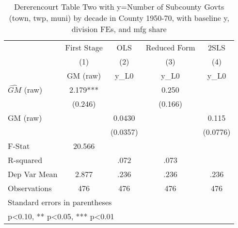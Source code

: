\begin{table}[htbp]\centering
\def\sym#1{\ifmmode^{#1}\else\(^{#1}\)\fi}
\caption{Dererencourt Table Two with y=Number of Subcounty Govts (town, twp, muni) by decade in County 1950-70, with baseline y, division FEs, and mfg share}
\begin{tabular}{l*{4}{c}}
\toprule
                    & First Stage   &         OLS   &Reduced Form   &        2SLS   \\
                    &\multicolumn{1}{c}{(1)}&\multicolumn{1}{c}{(2)}&\multicolumn{1}{c}{(3)}&\multicolumn{1}{c}{(4)}\\
                    &\multicolumn{1}{c}{GM  (raw)}&\multicolumn{1}{c}{y\_L0}&\multicolumn{1}{c}{y\_L0}&\multicolumn{1}{c}{y\_L0}\\
\midrule
$\hat{GM}$ (raw)    &       2.179***&               &       0.250   &               \\
                    &     (0.246)   &               &     (0.166)   &               \\
\addlinespace
GM  (raw)           &               &      0.0430   &               &       0.115   \\
                    &               &    (0.0357)   &               &    (0.0776)   \\
\midrule
F-Stat              &      20.566   &               &               &               \\
R-squared           &               &        .072   &        .073   &               \\
Dep Var Mean        &       2.877   &        .236   &        .236   &        .236   \\
Observations        &         476   &         476   &         476   &         476   \\
\bottomrule
\multicolumn{5}{l}{\footnotesize Standard errors in parentheses}\\
\multicolumn{5}{l}{\footnotesize * p<0.10, ** p<0.05, *** p<0.01}\\
\end{tabular}
\end{table}
